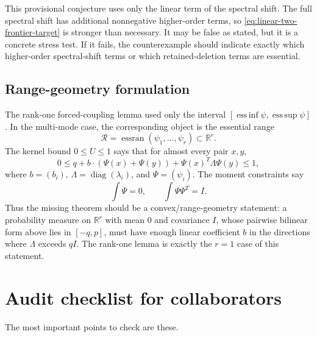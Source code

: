 \documentclass[11pt]{article}
\newcommand{\esssup}{\operatorname*{ess\,sup}}
\newcommand{\essinf}{\operatorname*{ess\,inf}}
\newcommand{\R}{\mathbb R}
\begin{document}
This provisional conjecture uses only the linear term of the spectral shift.  The full spectral shift has additional nonnegative higher-order terms, so \eqref{eq:linear-two-frontier-target} is stronger than necessary.  It may be false as stated, but it is a concrete stress test.  If it fails, the counterexample should indicate exactly which higher-order spectral-shift terms or which retained-deletion terms are essential.

\subsection{Range-geometry formulation}

The rank-one forced-coupling lemma used only the interval $[\essinf\psi,\esssup\psi]$.  In the multi-mode case, the corresponding object is the essential range
\[
        \mathcal R=\operatorname{essran}(\psi_1,\dots,\psi_r)\subset\R^r.
\]
The kernel bound $0\le U\le1$ says that for almost every pair $x,y$,
\[
        0\le
        q+b\cdot(\Psi(x)+\Psi(y))+\Psi(x)^T\Lambda\Psi(y)
        \le1,
\]
where $b=(b_i)$, $\Lambda=\operatorname{diag}(\lambda_i)$, and $\Psi=(\psi_i)$.  The moment constraints say
\[
        \int \Psi=0,
        \qquad
        \int \Psi\Psi^T=I.
\]
Thus the missing theorem should be a convex/range-geometry statement: a probability measure on $\R^r$ with mean $0$ and covariance $I$, whose pairwise bilinear form above lies in $[-q,p]$, must have enough linear coefficient $b$ in the directions where $\Lambda$ exceeds $qI$.  The rank-one lemma is exactly the $r=1$ case of this statement.

\section{Audit checklist for collaborators}

The most important points to check are these.
\end{document}
